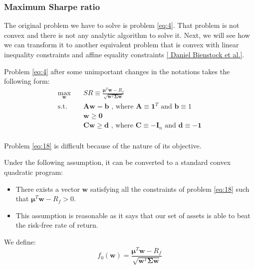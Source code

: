 \documentclass{beamer}
\begin{document}
\begin{frame}


\frametitle{\textbf{Maximum Sharpe ratio}}

\justifying
The original problem we have to solve is problem \eqref{eq:4}. That problem is not convex and there is not any analytic algorithm to solve it. Next, we will see how we can transform it to another equivalent problem that is convex with linear inequality constraints and affine equality constraints \hyperlink{bib}{[{\color{blue} Daniel Bienstock et al.}]}.

\vspace{0.8cm}
\justifying
Problem \eqref{eq:4} after some unimportant changes in the notations takes the following form:
\justifying
\begin{equation}
\begin{aligned}
\label{eq:18}
\max_{\mathbf{w}} \quad & SR \equiv \frac{\boldsymbol\mu^{T} \mathbf{w} - R_{f}}{\sqrt{\mathbf{w}^{T}\mathbf{\Sigma}\mathbf{w}}} \\
\textrm{s.t.} \quad & \mathbf{A} \mathbf{w} = \mathbf{b} \textrm{ , where } \mathbf{A} \equiv \mathbf{1}^{T} \textrm{ and } \mathbf{b} \equiv 1  \\
                             & \mathbf{w} \geq \mathbf{0} \\
                             & \mathbf{C}\mathbf{w} \geq \mathbf{d} \textrm{ , where } \mathbf{C} \equiv -\mathbf{I}_{n} \textrm{ and } \mathbf{d} \equiv -\mathbf{1}  \\
\end{aligned}
\end{equation}

\end{frame}




\begin{frame}

\justifying
Problem \eqref{eq:18} is difficult because of the nature of its objective.

\vspace{0.8cm}
\justifying
Under the following assumption, it can be converted to a standard convex quadratic program:
\begin{itemize}
	\justifying
	\item There exists a vector $\mathbf{w}$ satisfying all the constraints of problem \eqref{eq:18} such that $\boldsymbol\mu^{T} \mathbf{w} - R_{f} > 0$.
	\item This assumption is reasonable as it says that our set of assets is able to beat the risk-free rate of return.
\end{itemize}

\vspace{0.8cm}
\justifying
We define:
$$
f_{0}\left(\mathbf{w}\right) =  \frac{\boldsymbol\mu^{T} \mathbf{w} - R_{f}}{\sqrt{\mathbf{w}^{T}\mathbf{\Sigma}\mathbf{w}}}
$$

\end{frame}
\end{document}
